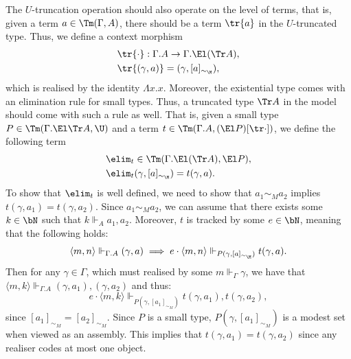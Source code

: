 The $U$-truncation operation should also operate on the level of terms, that is, given a term $a \in \Tm(\Gamma, A)$, there should be a term $\tr{a}$ in the $U$-truncated type. Thus, we define a context morphism 
\begin{align*}
	&\tr{\cdot} : \Gamma.A \to \Gamma.\El (\Tr A), \\
	&\tr{(\gamma, a)} = (\gamma, [a]_{\sim_\M}),
\end{align*}
which is realised by the identity $\Lambda x . x$.
Moreover, the existential type comes with an elimination rule for small types. Thus, a truncated type $\Tr A$ in the model should come with such a rule as well. That is, given a small type $P \in \Tm(\Gamma.\El \Tr A, \U)$ and a term $t \in \Tm(\Gamma.A, (\El P)[\tr \cdot ])$, we define the following term
\begin{align*}
	&\elim_t \in \Tm (\Gamma.\El (\Tr A), \El P), \\
	&\elim_t (\gamma, [a]_{\sim_\M}) = t(\gamma, a).
\end{align*}
To show that $\elim_t$ is well defined, we need to show that $a_1 \sim_M a_2$ implies $t(\gamma, a_1) = t(\gamma, a_2)$. Since $a_1 \sim_M a_2$, we can assume that there exists some $k \in \bN$ such that $k \Vdash_A a_1, a_2$. Moreover, $t$ is tracked by some $e \in \bN$, meaning that the following holds:
\[
\langle m, n \rangle \Vdash_{\Gamma.A} (\gamma, a) \implies e \cdot \langle m, n \rangle \Vdash_{P(\gamma, [a]_{\sim_\M})} t(\gamma, a).
\]
Then for any $\gamma \in \Gamma$, which must realised by some $m \Vdash_\Gamma \gamma$, we have that $\langle m, k \rangle \Vdash_{\Gamma.A} (\gamma, a_1), (\gamma, a_2)$ and thus:
\[
e \cdot \langle m, k \rangle \Vdash_{P(\gamma, [a_1]_{\sim_M})} t(\gamma, a_1), t(\gamma, a_2), 
\]
since $[a_1]_{\sim_M} = [a_2]_{\sim_M}$. Since $P$ is a small type, $P(\gamma, [a_1]_{\sim_M})$ is a modest set when viewed as an assembly. This implies that $t(\gamma, a_1) = t(\gamma, a_2) $ since any realiser codes at most one object. 

